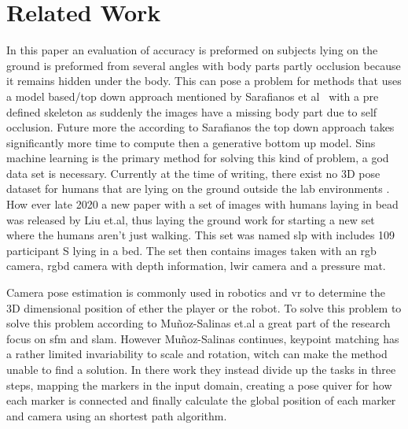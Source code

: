 \section{Related Work}
In this paper an evaluation of accuracy is preformed on subjects lying on the ground is preformed from several angles with body parts partly occlusion because it remains hidden under the body.
This can pose a problem for methods that uses a model based/top down approach mentioned by Sarafianos et al~\cite{sarafianos2016} with a pre defined skeleton as suddenly the images have a missing body part due to self occlusion.
Future more the according to Sarafianos the top down approach takes significantly more time to compute then a generative bottom up model.
Sins machine learning is the primary method for solving this kind of problem, a god data set is necessary.
Currently at the time of writing, there exist no 3D pose dataset for humans that are lying on the ground outside the lab environments \cite{yang2018, mehta2017, yasin2016, wang2019}.
How ever late 2020 a new paper with a set of images with humans laying in bead was released by Liu et.al\cite{liu2020simultaneously}, thus laying the ground work for starting a new set where the humans aren't just walking.
This set was named \ac{slp} with includes 109 participant S lying in a bed.
The set then contains images taken with an \ac{rgb} camera, \ac{rgbd} camera with depth information, \ac{lwir} camera and a pressure mat.

Camera pose estimation is commonly used in robotics and \ac{vr} to determine the 3D dimensional position of ether the player or the robot.
To solve this problem to solve this problem according to Mu{\~n}oz-Salinas et.al\cite{munoz2018mapping} a great part of the research focus on \ac{sfm} and \ac{slam}.
However Mu{\~n}oz-Salinas continues, keypoint matching has a rather limited invariability to scale and rotation, witch can make the method unable to find a solution.
In there work they instead divide up the tasks in three steps, mapping the markers in the input domain, creating a pose quiver for how each marker is connected and finally calculate the global position of each marker and camera using an shortest path algorithm.


